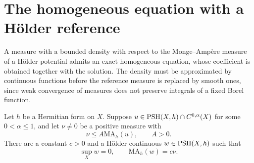 \section{The homogeneous equation with a H\"older reference}

A measure with a bounded density with respect to the Monge--Amp\`ere measure of a H\"older potential admits an exact homogeneous equation, whose coefficient is obtained together with the solution. The density must be approximated by continuous functions before the reference measure is replaced by smooth ones, since weak convergence of measures does not preserve integrals of a fixed Borel function.

\begin{theorem}\label{thm:holder-reference-homogeneous-equation}
Let $h$ be a Hermitian form on $X$. Suppose $u\in\mathrm{PSH}(X,h)\cap C^{0,\alpha}(X)$ for some $0<\alpha\leq1$, and let $\nu\neq0$ be a positive measure with
\[
 \nu\leq A\mathrm{MA}_h(u),\qquad A>0.
\]
There are a constant $c>0$ and a H\"older continuous $w\in\mathrm{PSH}(X,h)$ such that
\[
 \sup_Xw=0,\qquad\mathrm{MA}_h(w)=c\nu.
\]
\end{theorem}

